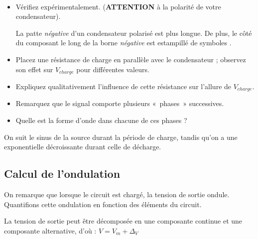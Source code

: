 \documentclass{../template/labo}
\begin{document}
\begin{manip}
\Question
{~\\
\begin{itemize}
\item Vérifiez expérimentalement. (\textbf{ATTENTION} à la polarité de votre condensateur).
\begin{astuce}
	La patte \textit{négative} d'un condensateur polarisé est plus longue.
	De plus, le côté du composant le long de la borne \textit{négative} est estampillé de symboles \faMinus.
\end{astuce}
\item Placez une résistance de charge en parallèle avec le condensateur ; observez son effet sur $V_{charge}$ pour différentes valeurs.
\item Expliquez qualitativement l'influence de cette résistance sur l'allure de $V_{charge}$.
\item Remarquez que le signal comporte plusieurs «~phases~» successives.
\item Quelle est la forme d'onde dans chacune de ces phases ?
\end{itemize}

}
{On suit le sinus de la source durant la période de charge, tandis qu'on a une exponentielle décroissante durant celle de décharge.}%
	\label{Q:13}
\end{manip}

\subsection{Calcul de l'ondulation}
On remarque que lorsque le circuit est chargé, la tension de sortie ondule. Quantifions cette ondulation en fonction des éléments du circuit.

La tension de sortie peut être décomposée en une composante continue et une composante alternative, d'où : $V=V_m+\Delta_V$
\end{document}
